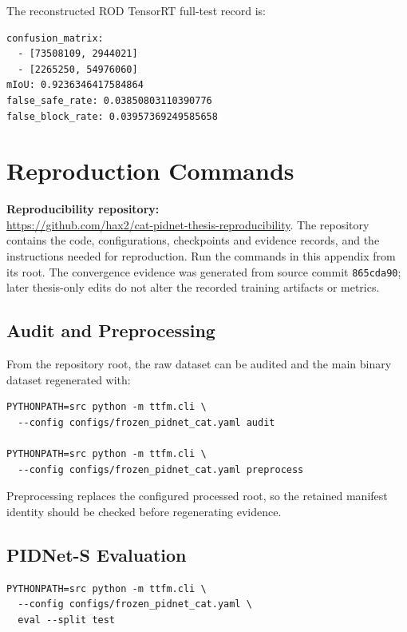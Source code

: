The reconstructed ROD TensorRT full-test record is:

\begin{lstlisting}
confusion_matrix:
  - [73508109, 2944021]
  - [2265250, 54976060]
mIoU: 0.9236346417584864
false_safe_rate: 0.03850803110390776
false_block_rate: 0.03957369249585658
\end{lstlisting}

\chapter{Reproduction Commands}
\label{app:reproduction}

\noindent\textbf{Reproducibility repository:}\\
\url{https://github.com/hax2/cat-pidnet-thesis-reproducibility}. The repository
contains the code, configurations, checkpoints and evidence records, and the
instructions needed for reproduction. Run the commands in this appendix from
its root. The convergence evidence was generated from source commit
\texttt{865cda90}; later thesis-only edits do not alter the recorded training
artifacts or metrics.

\section{Audit and Preprocessing}

From the repository root, the raw dataset can be audited and the main binary
dataset regenerated with:

\begin{lstlisting}
PYTHONPATH=src python -m ttfm.cli \
  --config configs/frozen_pidnet_cat.yaml audit

PYTHONPATH=src python -m ttfm.cli \
  --config configs/frozen_pidnet_cat.yaml preprocess
\end{lstlisting}

Preprocessing replaces the configured processed root, so the retained manifest
identity should be checked before regenerating evidence.

\section{PIDNet-S Evaluation}

\begin{lstlisting}
PYTHONPATH=src python -m ttfm.cli \
  --config configs/frozen_pidnet_cat.yaml \
  eval --split test
\end{lstlisting}


